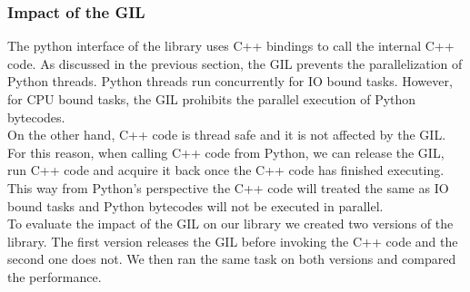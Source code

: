 \begin{spacing}{1.2}
    \subsubsection{Impact of the GIL}
    The python interface of the library uses C++ bindings to call the internal C++ code. As discussed in the previous section,
    the GIL prevents the parallelization of Python threads. Python threads run concurrently for IO bound tasks. However,
    for CPU bound tasks, the GIL prohibits the parallel execution of Python bytecodes.\\

    On the other hand, C++ code is thread safe and it is not affected by the GIL. For this reason, when calling C++ code
    from Python, we can release the GIL, run C++ code and acquire it back once the C++ code has finished executing. This way
    from Python's perspective the C++ code will treated the same as IO bound tasks and Python bytecodes will not be executed
    in parallel.\\

    To evaluate the impact of the GIL on our library we created two versions of the library. The first version releases the
    GIL before invoking the C++ code and the second one does not. We then ran the same task on both versions and compared the
    performance.\\


\end{spacing}
